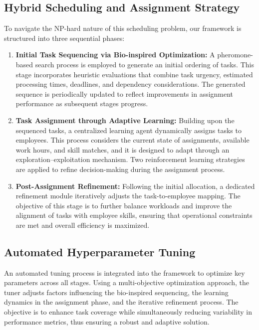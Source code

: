 \documentclass[conference]{IEEEtran}
\begin{document}
	\subsection{Hybrid Scheduling and Assignment Strategy}

	To navigate the NP-hard nature of this scheduling problem, our framework is structured
	into three sequential phases:

	\begin{enumerate}
		\item \textbf{Initial Task Sequencing via Bio-inspired Optimization:} A
			pheromone-based search process is employed to generate an initial ordering
			of tasks. This stage incorporates heuristic evaluations that combine task urgency,
			estimated processing times, deadlines, and dependency considerations. The generated
			sequence is periodically updated to reflect improvements in assignment performance
			as subsequent stages progress.

		\item \textbf{Task Assignment through Adaptive Learning:} Building upon the
			sequenced tasks, a centralized learning agent dynamically assigns tasks to
			employees. This process considers the current state of assignments, available
			work hours, and skill matches, and it is designed to adapt through an exploration–exploitation
			mechanism. Two reinforcement learning strategies are applied to refine
			decision-making during the assignment process.

		\item \textbf{Post-Assignment Refinement:} Following the initial allocation,
			a dedicated refinement module iteratively adjusts the task-to-employee mapping.
			The objective of this stage is to further balance workloads and improve
			the alignment of tasks with employee skills, ensuring that operational constraints
			are met and overall efficiency is maximized.
	\end{enumerate}

	\subsection{Automated Hyperparameter Tuning}

	An automated tuning process is integrated into the framework to optimize key parameters
	across all stages. Using a multi-objective optimization approach, the tuner adjusts
	factors influencing the bio-inspired sequencing, the learning dynamics in the
	assignment phase, and the iterative refinement process. The objective is to
	enhance task coverage while simultaneously reducing variability in performance
	metrics, thus ensuring a robust and adaptive solution.
\end{document}
